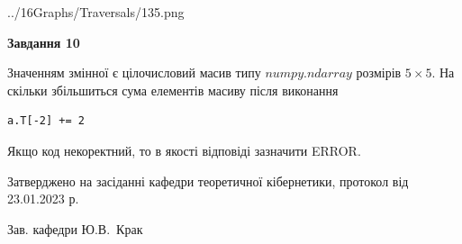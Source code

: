 \documentclass[12pt, ukrainian]{article}
\begin{document}
{\begin {large}
\begin{center}
	{../16Graphs/Traversals/135.png}
\end{center}\par
\newpage

{\begin {center}\textbf{Завдання 10}\end {center}}\par
Значенням змінної  є цілочисловий масив типу $numpy.ndarray$ розмірів $5{\times}5$. На скільки збільшиться сума елементів масиву  після виконання
\begin{verbatim}
a.T[-2] += 2
\end{verbatim}


Якщо код некоректний, то в якості відповіді зазначити ERROR.\par
\newpage


\end {large}
}
{\smallskip \begin {small} Затверджено на засіданні кафедри теоретичної кібернетики, протокол  від   23.01.2023 р.\par\smallskip\smallskip
{\parbox {6.5 cm}{Зав. кафедри \dotfill Ю.В.~Крак}} \end{small}}
\end{document}
